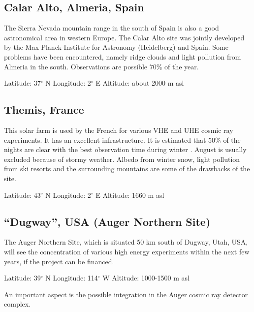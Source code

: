 \subsection{Calar Alto, Almeria, Spain}

\medskip The Sierra Nevada mountain range in the south of Spain is also a good
astronomical area in western Europe. The Calar Alto site was jointly
developed by the Max-Planck-Institute for Astronomy (Heidelberg) and Spain.
Some problems have been encountered, namely ridge clouds and light pollution
from Almeria in the south. Observations are possible 70\% of the year.

\noindent
Latitude: 37$^\circ$ N \newline
Longitude: 2$^\circ$ E \newline
Altitude: about 2000 m asl

\subsection{Themis, France}

\medskip This solar farm is used by the French for various VHE and UHE cosmic ray
experiments. It has an excellent infrastructure. It is estimated that 50\%
of the nights are clear with the best observation time during winter
\cite{fleury:94}. August is usually excluded because of stormy weather. Albedo
from winter snow, light pollution from ski resorts and the surrounding
mountains are some of the drawbacks of the site.

\noindent
Latitude: 43$^\circ$ N \newline
Longitude: 2$^\circ$ E \newline
Altitude: 1660 m asl

\subsection{``Dugway'', USA (Auger Northern Site)}

\medskip The Auger Northern Site, which is situated 50 km south of Dugway, Utah, USA,
will see the concentration of various high energy experiments within the
next few years, if the project can be financed.

\noindent
Latitude: 39$^\circ$ N \newline
Longitude: 114$^\circ$ W \newline
Altitude: 1000-1500 m asl

An important aspect is the possible integration in the Auger cosmic ray
detector complex.

